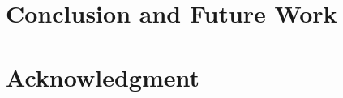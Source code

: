 \documentclass[conference]{IEEEtran}
\begin{document}

\section{Conclusion and Future Work}

\section*{Acknowledgment}



\end{document}
